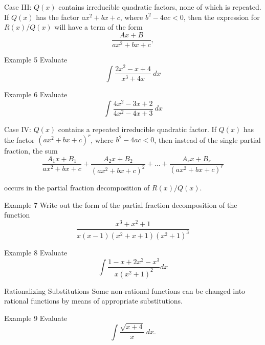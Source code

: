 \documentclass{beamer}
\begin{document}
\begin{frame}{Case III: \(Q(x)\) contains irreducible quadratic factors, none of which is repeated. }
If \(Q(x)\) has the factor \(ax^2 +bx +c\), where \(b^2 -4ac <0\), then the expression for \(R(x)/Q(x)\) will have a term of the form \[\dfrac{Ax+B}{ax^2 +bx +c},\] 
\end{frame}

\begin{frame}{Example 5}
Evaluate \[\int \dfrac{2x^2 -x +4}{x^3+4x}~dx\]
\end{frame}

\begin{frame}{Example 6}
Evaluate \[\int \dfrac{4x^2 -3x +2}{4x^2-4x+3}~dx\]
\end{frame}

\begin{frame}{Case IV: \(Q(x)\) contains a repeated irreducible quadratic factor.}
If \(Q(x)\) has the factor \((ax^2+bx+c)^r\), where \(b^2 -4ac<0\), then instead of the single partial fraction, the sum \[\dfrac{A_1x +B_1}{ax^2+bx+c}+\dfrac{A_2x +B_2}{(ax^2+bx+c)^2}+\dots+\dfrac{A_rx +B_r}{(ax^2+bx+c)^r}\]

occurs in the partial fraction decomposition of \(R(x)/Q(x)\).
\end{frame}

\begin{frame}{Example 7}
Write out the form of the partial fraction decomposition of the function \[
\dfrac{x^3 +x^2 +1}{x(x-1)(x^2+x+1)(x^2+1)^3}
\]
\end{frame}

\begin{frame}{Example 8}
Evaluate \[
\int \dfrac{1-x+2x^2-x^3}{x(x^2+1)^2}dx
\]
\end{frame}

\begin{frame}{Rationalizing Substitutions}
Some non-rational functions can be changed into rational functions by means of appropriate substitutions. 
\begin{block}{Example 9}
Evaluate \[\int \dfrac{\sqrt{x+4}}{x}~dx.\]
\end{block}
\end{frame}
\end{document}
